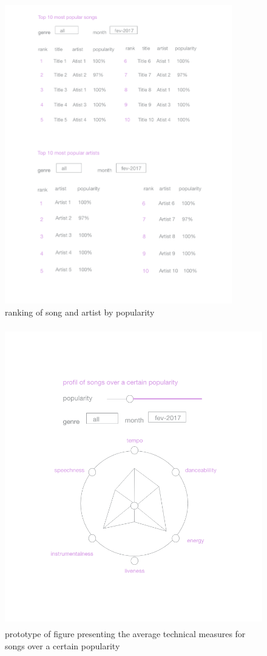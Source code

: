 \documentclass[12pt]{article}
\begin{document}
\begin{figure}
    \centering
    \includegraphics[height=13cm]{ranking.png}
    \caption{ranking of song and artist by popularity}
    \label{fig:my_label}
\end{figure}

\begin{figure}
    \centering
    \includegraphics[height=13cm]{technical.png}
    \caption{prototype of figure presenting the average technical measures for songs over a certain popularity}
    \label{fig:my_label}
\end{figure}

\newpage


\end{document}
